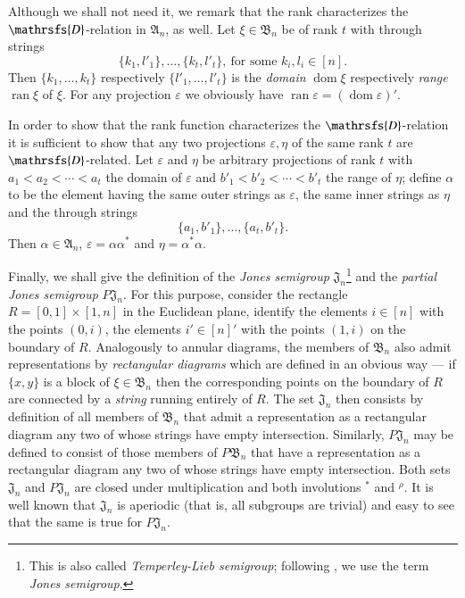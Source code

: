 \documentclass[preprint,1p,times]{elsarticle}
\DeclareMathOperator{\dom}{dom} \DeclareMathOperator{\ran}{ran}
\numberwithin{equation}{section}
\theoremstyle{remark}
\def\Dc{\mathrsfs{D}}
\def\al{\alpha}
\def\ep{\varepsilon}
\def\A{\mathfrak{A}}
\def\B{\mathfrak{B}}
\def\J{\mathfrak{J}}
\begin{document}
Although we shall not need it, we remark that the rank characterizes the $\Dc$-relation in $\A_n$, as well. Let
$\xi\in\B_n$ be of rank $t$ with through strings
$$\{k_1,l'_1\},\dots,\{k_t,l'_t\},\ \mbox{for some } k_i,l_i\in [n].$$
Then $\{k_1,\dots, k_t\}$ respectively $\{l'_1,\dots,l'_t\}$ is the \emph{domain} $\dom \xi$ respectively \emph{range}
$\ran \xi$ of $\xi$. For any projection $\ep$ we obviously have $\ran \ep=(\dom \ep)'$.

In order to show that the rank function characterizes the $\Dc$-relation it is sufficient to show that any two
projections $\ep, \eta$ of the same rank $t$ are $\Dc$-related. Let $\ep$ and $\eta$ be arbitrary projections of rank
$t$ with $a_1<a_2<\cdots<a_t$  the domain of $\ep$ and $b'_1<b'_2<\cdots<b'_t$ the range of $\eta$; define $\alpha$ to
be the element having the same outer strings as $\ep$, the same inner strings as $\eta$ and the through strings
$$\{a_1,b'_1\},\dots,\{a_t,b'_t\}.$$
Then $\alpha\in \A_n$, $\ep=\al\al^*$ and $\eta=\al^*\al$.

Finally, we shall give the definition of the \emph{Jones semigroup} $\J_n$\footnote{This is also called
\emph{Temperley-Lieb semigroup}; following \cite{fitzgerald}, we use the term \emph{Jones semigroup}.}
\cite{temperleylieb, fitzgerald} and the \emph{partial Jones semigroup} $P\J_n$. For this purpose, consider the
rectangle $R=[0,1]\times[1,n]$ in the Euclidean plane, identify the elements $i\in [n]$ with the points $(0,i)$, the
elements $i'\in [n]'$ with the points $(1,i)$ on the boundary of $R$. Analogously to annular diagrams, the members of
$\B_n$ also admit representations by \emph{rectangular diagrams} which are defined in an obvious way --- if $\{x,y\}$
is a block of $\xi\in \B_n$ then the corresponding points on the boundary of $R$ are connected by a \emph{string}
running entirely of $R$. The set $\J_n$ then consists by definition of all members of $\B_n$ that admit a
representation as a rectangular diagram any two of whose strings have empty intersection.  Similarly, $P\J_n$ may be
defined to consist of those members of $P\B_n$ that have a representation as a rectangular diagram any two of whose
strings have empty intersection. Both sets $\J_n$ and $P\J_n$ are closed under multiplication and both involutions $^*$
and $^\rho$. It is well known that $\J_n$ is aperiodic (that is, all subgroups are trivial) \cite{fitzgerald} and easy
to see that the same is true for $P\J_n$.
\end{document}
